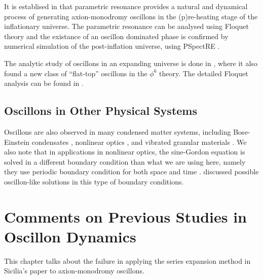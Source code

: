 \documentclass{report}
\begin{document}
It is establised in \cite{Amin:2010dc, Amin:2011hj} that parametric resonance provides a natural and dynamical process of generating axion-monodromy oscillons in the (p)re-heating stage of the inflationary universe. The parametric resonance can be analysed using Floquet theory and the existance of an oscillon dominated phase is confirmed by numerical simulation of the post-inflation universe, using PSpectRE \cite{Easther:2010qz}.

The analytic study of oscillons in an expanding universe is done in \cite{Amin:2010jq}, where it also found a new class of ``flat-top'' oscillons in the $\phi^6$ theory. The detailed Floquet analysis can be found in \cite{Amin:2010dc}.

\section{Oscillons in Other Physical Systems}
Oscillons are also observed in many condensed matter systems, including Bose-Einstein condensates \cite{umbanhowar1996localized}, nonlinear optics \cite{Copeland:2014qra}, and vibrated granular materials \cite{Tsimring:1997zz}. We also note that in applications in nonlinear optics, the sine-Gordon equation is solved in a different boundary condition than what we are using here, namely they use periodic boundary condition for both space and time \cite{JAWORSKI1982427, 0305-4470-15-10-015}. \cite{JAWORSKI1982427, 0305-4470-15-10-015} discussed possible oscillon-like solutions in this type of boundary conditions.

\chapter{Comments on Previous Studies in Oscillon Dynamics}
This chapter talks about the failure in applying the series expansion method in Sicilia's paper to axion-monodromy oscillons.
\end{document}
